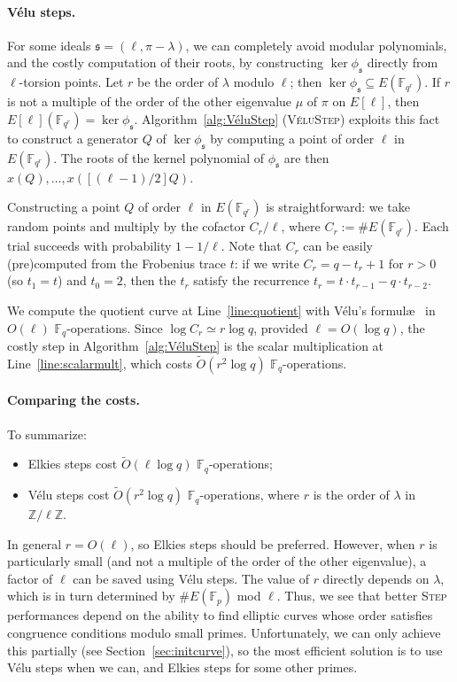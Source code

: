\documentclass{llncs}
\newcommand{\F}{\mathbb{F}}
\newcommand{\Z}{\mathbb{Z}}
\newcommand{\softO}{\tilde{O}}
\newcommand{\algstyle}[1]{\textsc{#1}}
\renewcommand{\frak}{\mathfrak}
\begin{document}
\paragraph{Vélu steps.}

For some ideals $\frak{s} = (\ell,\pi-\lambda)$,
we can completely avoid modular polynomials,
and the costly computation of their roots,
by constructing $\ker\phi_{\frak{s}}$ directly from $\ell$-torsion points.
Let $r$ be the order of $\lambda$ modulo $\ell$;
then $\ker\phi_{\frak s} \subseteq E(\F_{q^r})$.
If $r$ is not a multiple of the order of the other eigenvalue $\mu$
of $\pi$ on $E[\ell]$,
then $E[\ell](\F_{q^r}) = \ker\phi_{\frak s}$.
Algorithm~\ref{alg:VéluStep} (\algstyle{VéluStep}) 
exploits this fact to construct a generator $Q$ of $\ker\phi_{\frak s}$
by computing a point of order $\ell$ in $E(\F_{q^r})$.
The roots of the kernel polynomial of $\phi_{\frak s}$
are then $x(Q), \ldots, x([(\ell-1)/2]Q)$.

Constructing a point $Q$ of order $\ell$ in $E(\F_{q^r})$
is straightforward:
we take random points and multiply by the cofactor $C_r/\ell$,
where $C_r := \#E(\F_{q^r})$.
Each trial succeeds with probability $1 - 1/\ell$.
Note that $C_r$ can be easily (pre)computed from the Frobenius trace $t$:
if we write $C_r = q - t_r + 1$ for 
$r > 0$ (so $t_1 = t$) and $t_0 = 2$,
then the $t_r$ satisfy the recurrence
$t_r = t\cdot t_{r-1} - q\cdot t_{r-2}$. 

We compute the quotient curve at Line~\ref{line:quotient} 
with Vélu's formul\ae~\cite{Velu71} in $O(\ell)$ $\F_q$-operations.
Since $\log C_r\simeq r\log q$, provided $\ell = O(\log q)$,
the costly step in Algorithm~\ref{alg:VéluStep} is the scalar
multiplication at Line~\ref{line:scalarmult}, which costs
$\softO(r^2\log q)$ $\F_q$-operations.

\paragraph{Comparing the costs.}
To summarize:
\begin{itemize}
\item Elkies steps cost $\softO(\ell\log q)$ $\F_q$-operations;
\item Vélu steps cost $\softO(r^2\log q)$ $\F_q$-operations,
    where $r$ is the order of $\lambda$ in $\Z/\ell\Z$.
\end{itemize}
In general $r = O(\ell)$, so Elkies steps should be preferred. 
However, when $r$ is particularly small
(and not a multiple of the order of the other eigenvalue),
a factor of $\ell$ can be saved using Vélu steps.
The value of $r$ directly depends on $\lambda$, which is in turn determined by
$\#E(\F_p)$ mod $\ell$. Thus, we see that better \algstyle{Step} performances
depend on the ability to find elliptic curves whose order
satisfies congruence conditions modulo small primes.
Unfortunately, we can only achieve this partially
(see Section~\ref{sec:initcurve}), so the most efficient solution is
to use Vélu steps when we can, and Elkies steps for some other primes.
\end{document}
